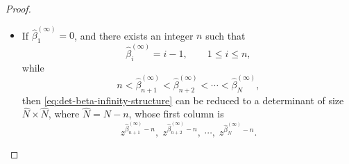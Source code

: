 \documentclass[preprint,3p,10pt]{elsarticle}
\theoremstyle{definition}
\begin{document}
\begin{proof}
\begin{itemize}
    \item If \(\widehat{\beta}^{(\infty)}_1=0\), and there exists an integer \(n\) such that
    \begin{equation}
        \widehat{\beta}^{(\infty)}_i=i-1,\qquad 1\le i\le n,
    \end{equation}
    while
    \begin{equation}
        n<\widehat{\beta}^{(\infty)}_{n+1}<\widehat{\beta}^{(\infty)}_{n+2}<\cdots<\widehat{\beta}^{(\infty)}_N,
    \end{equation}
    then \eqref{eq:det-beta-infinity-structure} can be reduced to a determinant of size \(\widehat{N}\times \widehat{N}\), where \(\widehat{N}=N-n\), whose first column is
    \begin{equation}
        z^{\widehat{\beta}^{(\infty)}_{n+1}-n},
        \; z^{\widehat{\beta}^{(\infty)}_{n+2}-n},
        \; \cdots,\;
        z^{\widehat{\beta}^{(\infty)}_{N}-n}.
    \end{equation}
\end{itemize}


\end{proof}
\end{document}
